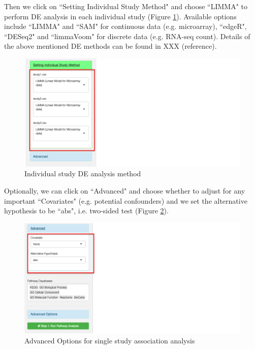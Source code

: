 Then we click on ``Setting Individual Study Method" and choose ``LIMMA" to perform DE analysis in each individual study (Figure \ref{fig:IndDE}). Available options include ``LIMMA" and ``SAM" for continuous data (e.g. microarray), ``edgeR", ``DESeq2" and ``limmaVoom" for discrete data (e.g. RNA-seq count). Details of the above mentioned DE methods can be found in XXX (reference).

\begin{figure}[H]
\begin{center}
\includegraphics[scale=0.4]{./figure/metaPath/IndDE}
\caption{Individual study DE analysis method}
\label{fig:IndDE}
\end{center}
\end{figure}

Optionally, we can click on ``Advanced" and choose whether to adjust for any important ``Covariates" (e.g. potential confounders) and we set the alternative hypothesis to be ``abs", i.e. two-sided test (Figure \ref{fig:Adv}). 

\begin{figure}[H]
\begin{center}
\includegraphics[scale=0.4]{./figure/metaPath/Adv}
\caption{Advanced Options for single study association analysis}
\label{fig:Adv}
\end{center}
\end{figure}

